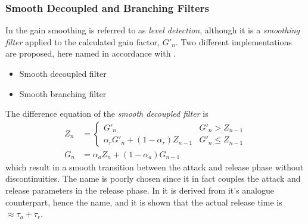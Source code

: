\documentclass[../main2.tex]{subfiles}
\begin{document}
\subsubsection{Smooth Decoupled and Branching Filters}
In \cite{reiss2012tutorial} the gain smoothing is referred to as \emph{level detection}, although it is a \emph{smoothing filter} applied to the calculated gain factor, $G'_n$. Two different implementations are proposed, here named in accordance with \cite{reiss2012tutorial}.
\begin{itemize}
\item{Smooth decoupled filter}
\item{Smooth branching filter}
\end{itemize}
The difference equation of the \emph{smooth decoupled filter} is
\begin{equation}
\begin{split}
Z_n &= \begin{cases}
   G'_n								& G'_n > Z_{n-1} \\
    \alpha_{r} G'_n + (1-\alpha_{r}) Z_{n-1} 	& G'_n \leq Z_{n-1}
\end{cases} \\
G_n &= \alpha_{a} Z_n + (1-\alpha_{a}) G_{n-1}
\end{split}
\end{equation}
which result in a smooth transition between the attack and release phase without discontinuities. The name is poorly chosen since it in fact couples the attack and release parameters in the release phase. In \cite{reiss2012tutorial} it is derived from it's analogue counterpart, hence the name, and it is shown that the actual release time is $\approx \tau_a + \tau_r$.
\end{document}
